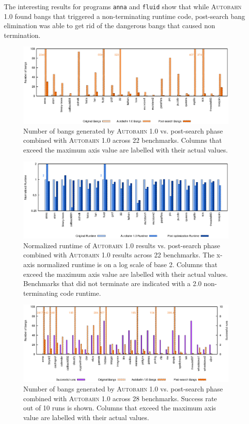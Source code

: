 \documentclass[format=sigplan, review=true]{acmart}
\newcommand{\dangerous}[0]{dangerous}
\newcommand{\Ao}[0]{\textsc{Autobahn 1.0}}
\newcommand{\postopt}[0]{post-search}
\newcommand{\nonterm}[0]{non-terminating}
\begin{document}
The interesting results for programs \texttt{anna} and \texttt{fluid} show that while \Ao{} found bangs that triggered a \nonterm{} runtime code, \postopt{} bang elimination was able to get rid of the \dangerous{} bangs that caused non termination. 

\begin{figure}
\includegraphics[width=\textwidth]{aut-post-bangs}
\caption{Number of bangs generated by \Ao{} vs. \postopt{} phase combined with \Ao{} across 22 benchmarks. Columns that exceed the maximum axis value are labelled with their actual values.}
\end{figure}

\begin{figure}
\includegraphics[width=\textwidth]{aut-post}
\caption{Normalized runtime of \Ao{} results vs. \postopt{} phase combined with \Ao{} results across 22 benchmarks. The x-axis normalized runtime is on a log scale of base 2. Columns that exceed the maximum axis value are labelled with their actual values. Benchmarks that did not terminate are indicated with a 2.0 \nonterm{} code runtime.}
\end{figure}

\begin{figure}
\includegraphics[width=\textwidth]{ap-partial-bangs}
\caption{Number of bangs generated by \Ao{} vs. \postopt{} phase combined with \Ao{} across 28 benchmarks. Success rate out of 10 runs is shown. Columns that exceed the maximum axis value are labelled with their actual values.}
\end{figure}
\end{document}
